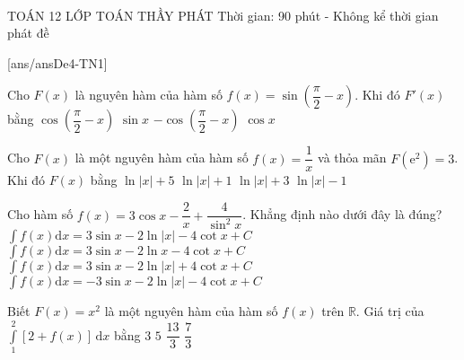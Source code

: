 ﻿﻿\begin{name}
	{\tenchude}
	{TOÁN 12}
	{LỚP TOÁN THẦY PHÁT}
	{Thời gian: 90 phút - Không kể thời gian phát đề}
\end{name}
[ans/ansDe4-TN1]
\begin{ex}%
	Cho $F(x)$ là nguyên hàm của hàm số $f(x)=\sin \left(\dfrac{\pi}{2}-x\right)$. Khi đó $F'(x)$ bằng
	\choice
	{$\cos \left(\dfrac{\pi}{2}-x\right)$}
	{$\sin x$}
	{$-\cos \left(\dfrac{\pi}{2}-x\right)$}
	{\True $\cos x$}
\end{ex}

\begin{ex}%
	Cho $F(x)$ là một nguyên hàm của hàm số $f(x)=\dfrac{1}{x}$ và thỏa mãn $F\left(\mathrm{e}^2\right)=3$. Khi đó $F(x)$ bằng
	\choice
	{$\ln |x|+5$}
	{\True $\ln |x|+1$}
	{$\ln |x|+3$}
	{$\ln |x|-1$}
\end{ex}

\begin{ex}%
	Cho hàm số $f(x)=3\cos x-\dfrac{2}{x}+\dfrac{4}{{{\sin }^2}x}$. Khẳng định nào dưới đây là đúng?
	\choice
	{\True $\displaystyle\int{f(x)\mathrm{d}x}=3\sin x-2\ln |x|-4\cot x+C$}
	{ $\displaystyle\int{f(x)\mathrm{d}x}=3\sin x-2\ln x-4\cot x+C$}
	{ $\displaystyle\int{f(x)\mathrm{d}x}=3\sin x-2\ln |x|+4\cot x+C$}
	{ $\displaystyle\int{f(x)\mathrm{d}x}=-3\sin x-2\ln |x|-4\cot x+C$}
\end{ex}

\begin{ex}%
	Biết $F(x)=x^2$ là một nguyên hàm của hàm số $f(x)$ trên $\mathbb{R}$. Giá trị của $\displaystyle  \int\limits_1^2\left[2+f(x)\right]\mathrm{\,d}x$ bằng
	\choice
	{$3$}
	{\True $5$}
	{$\dfrac{13}{3}$}
	{$\dfrac{7}{3}$}
\end{ex}

